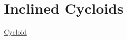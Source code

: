 \documentclass{ximera}
\begin{document}
\section{Inclined Cycloids}

\href{https://www.geogebra.org/classic/gchvgn68}{Cycloid}

 
\begin{onlineOnly}
    \begin{center}
\end{center}
\end{onlineOnly}
\end{document}
